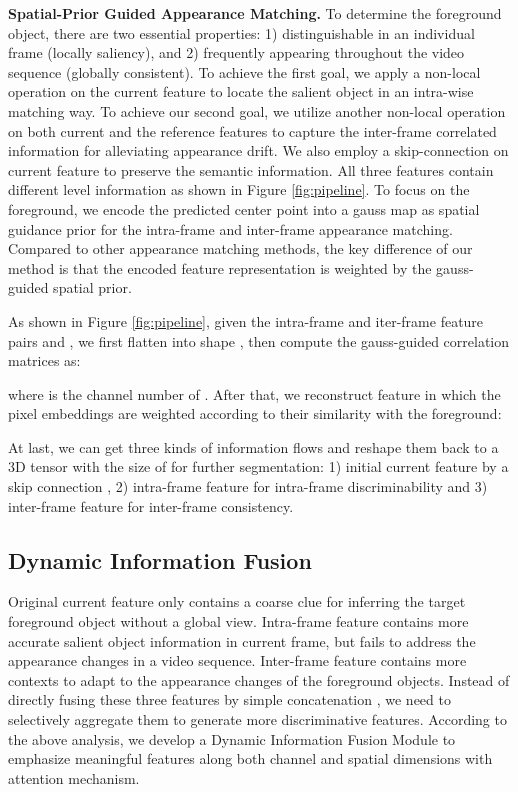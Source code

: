 \documentclass[letterpaper]{article} \usepackage{aaai20}  \usepackage{times}  \usepackage{helvet} \usepackage{courier}  \usepackage[hyphens]{url}  \usepackage{graphicx} \urlstyle{rm} \def\UrlFont{\rm}  \usepackage{graphicx}  \frenchspacing  \setlength{\pdfpagewidth}{8.5in}  \setlength{\pdfpageheight}{11in}  \usepackage{amssymb}
\begin{document}
\noindent \textbf{Spatial-Prior Guided Appearance Matching.}
To determine the foreground object, there are two essential properties: 1) distinguishable in an individual frame
(locally saliency), and 2) frequently appearing throughout the video sequence (globally consistent).
To achieve the first goal, 
we apply a non-local operation \cite{wang2018non} on the current feature  to locate the salient object in an intra-wise matching way. To achieve our second goal, we utilize another non-local operation on both current and the reference features  to capture the inter-frame correlated information for alleviating appearance drift. We also employ a skip-connection on current feature  to preserve the semantic information. All three features contain different level information as shown in Figure \ref{fig:pipeline}. To focus on the foreground, we encode the predicted center point  into a gauss map  as spatial guidance prior for the intra-frame and inter-frame appearance matching. 
Compared to other appearance matching methods, the key difference of our method is that the encoded feature representation is weighted by the gauss-guided spatial prior.

As shown in Figure \ref{fig:pipeline}, 
given the intra-frame and iter-frame feature pairs  and , we first flatten  into shape , then compute the gauss-guided correlation matrices  as:


where  is the channel number of . After that, we reconstruct feature  in which the pixel embeddings are weighted according to their similarity with the
foreground:


At last, we can get three kinds of information flows and reshape them back to a 3D tensor with the size of  for further segmentation: 1) initial current feature  by a skip connection \cite{he2016deep}, 2) intra-frame feature  for intra-frame discriminability and 3) inter-frame feature  for inter-frame consistency.

\subsection{Dynamic Information Fusion}
Original current feature  only contains a coarse clue for inferring the target foreground object without a global view. Intra-frame feature  contains more accurate salient object information in current frame, but fails to address the appearance changes in a video sequence. Inter-frame feature  contains more contexts to adapt to the appearance changes of the foreground objects. Instead of directly fusing these three features by simple concatenation \cite{lu2019see,yang2019anchor}, we need to selectively aggregate them to generate more discriminative features. According to the above analysis, 
we develop a Dynamic Information Fusion Module to emphasize meaningful features along both channel and spatial dimensions with attention mechanism.
\end{document}
